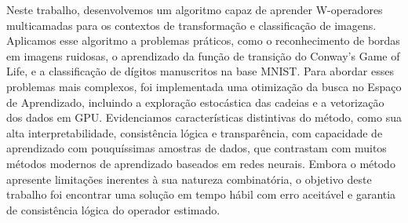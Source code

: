 {Neste trabalho, desenvolvemos um algoritmo capaz de aprender W-operadores multicamadas para os contextos de transformação e classificação de imagens. Aplicamos esse algoritmo a problemas práticos, como o reconhecimento de bordas em imagens ruidosas, o aprendizado da função de transição do Conway's Game of Life, e a classificação de dígitos manuscritos na base MNIST. Para abordar esses problemas mais complexos, foi implementada uma otimização da busca no Espaço de Aprendizado, incluindo a exploração estocástica das cadeias e a vetorização dos dados em GPU. Evidenciamos características distintivas do método, como sua alta interpretabilidade, consistência lógica e transparência, com capacidade de aprendizado com pouquíssimas amostras de dados, que contrastam com muitos métodos modernos de aprendizado baseados em redes neurais. Embora o método apresente limitações inerentes à sua natureza combinatória, o objetivo deste trabalho foi encontrar uma solução em tempo hábil com erro aceitável e garantia de consistência lógica do operador estimado.}

